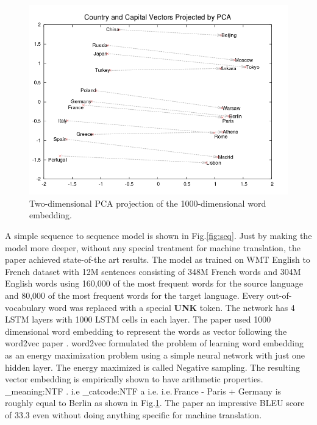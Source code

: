 \documentclass[conference]{IEEEtran}
\makeatletter
\newcommand\latinabbrev[1]{
  \peek_meaning:NTF . {%
    #1\@}%
  { \peek_catcode:NTF a {%
      #1.\@ }%
    {#1.\@}}}
\def\ie{\latinabbrev{i.e}}
\makeatother
\begin{document}
 \begin{figure}
  \centering
      \includegraphics[width=.9\linewidth]{img/wordvec.png} 
	\caption{Two-dimensional PCA projection of the 1000-dimensional word embedding.}
	\label{fig:wordvec}
\end{figure}
A simple sequence to sequence model is shown in  Fig.\ref{fig:seq}. Just by making the model more deeper, without any special treatment for machine translation, the paper achieved state-of-the art results. The model as trained on WMT English to French dataset with 12M sentences consisting of 348M French words and 304M English words using 160,000 of the most frequent words for the source language and 80,000 of the most frequent words for the target language. Every out-of-vocabulary word was replaced with a special \textbf{UNK} token. The network has 4 LSTM layers with 1000 LSTM cells in each layer. The paper used 1000 dimensional word embedding to represent the words as vector following the word2vec paper \cite{mikolov2013distributed}. word2vec formulated the problem of learning word embedding as an energy maximization problem using a simple neural network with just one hidden layer. The energy maximized is called Negative sampling. The resulting vector embedding is empirically shown to have arithmetic properties. \ie  $\,$France - Paris + Germany is roughly equal to Berlin as shown in Fig.\ref{fig:wordvec}. The paper an impressive BLEU score of 33.3 even without doing anything specific for machine translation.
\end{document}
